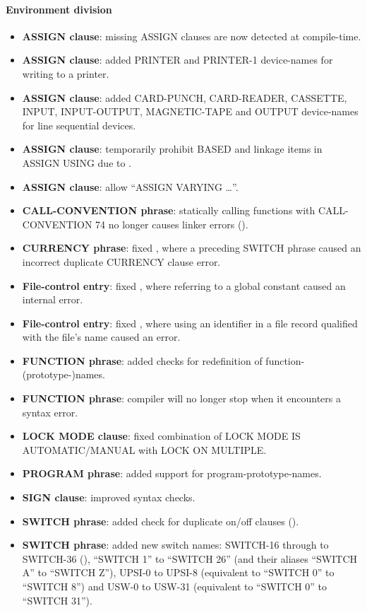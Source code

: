 \paragraph{Environment division}
\begin{itemize}
\item \textbf{ASSIGN clause}: missing ASSIGN clauses are now detected at compile-time.
\item \textbf{ASSIGN clause}: added PRINTER and PRINTER-1 device-names for writing to a printer.
\item \textbf{ASSIGN clause}: added CARD-PUNCH, CARD-READER, CASSETTE, INPUT, INPUT-OUTPUT, MAGNETIC-TAPE and OUTPUT device-names for line sequential devices.
\item \textbf{ASSIGN clause}: temporarily prohibit BASED and linkage items in ASSIGN USING due to .
\item \textbf{ASSIGN clause}: allow ``ASSIGN VARYING \ldots''.
\item \textbf{CALL-CONVENTION phrase}: statically calling functions with CALL-CONVENTION 74 no longer causes linker errors ().
\item \textbf{CURRENCY phrase}: fixed , where a preceding SWITCH phrase caused an incorrect duplicate CURRENCY clause error.
\item \textbf{File-control entry}: fixed , where referring to a global constant caused an internal error.
\item \textbf{File-control entry}: fixed , where using an identifier in a file record qualified with the file's name caused an error.
\item \textbf{FUNCTION phrase}: added checks for redefinition of function-(prototype-)names.
\item \textbf{FUNCTION phrase}: compiler will no longer stop when it encounters a syntax error.
\item \textbf{LOCK MODE clause}: fixed combination of LOCK MODE IS AUTOMATIC/MANUAL with LOCK ON MULTIPLE.
\item \textbf{PROGRAM phrase}: added support for program-prototype-names.
\item \textbf{SIGN clause}: improved syntax checks.
\item \textbf{SWITCH phrase}: added check for duplicate on\slash{}off clauses ().
\item \textbf{SWITCH phrase}: added new switch names: SWITCH-16 through to SWITCH-36 (), ``SWITCH 1'' to ``SWITCH 26'' (and their aliases  ``SWITCH A'' to ``SWITCH Z''), UPSI-0 to UPSI-8 (equivalent to ``SWITCH 0'' to ``SWITCH 8'') and USW-0 to USW-31 (equivalent to ``SWITCH 0'' to ``SWITCH 31'').
\end{itemize}

